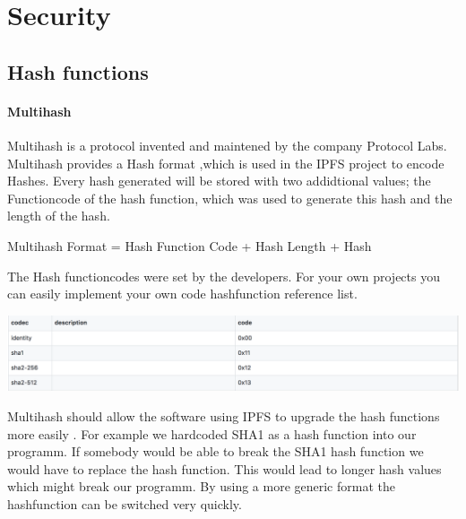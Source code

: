 \documentclass[a4paper,11pt, oneside]{report}
\theoremstyle{definition}
\begin{document}
\chapter{Security}
\section{Hash functions}
\subsubsection{Multihash}
Multihash is a protocol invented and maintened by the company Protocol Labs. Multihash provides a Hash format ,which is used in the IPFS project to encode Hashes. Every hash generated will be stored with two addidtional values; the Functioncode of the  hash function, which was used to generate this hash and the length of the hash.
\begin{center}
	Multihash Format = Hash Function Code + Hash Length + Hash
\end{center}
The Hash functioncodes were set by the developers. For your own projects you can easily implement your own code hashfunction reference list.
\begin{center}
	\includegraphics[width=\textwidth]{img/multiformat_hashfunctionid.png}
\end{center}
Multihash should allow the software using IPFS to upgrade the hash functions more easily \cite{multihash}. For example we hardcoded SHA1 as a hash function into our programm. If somebody would be able to break the SHA1 hash function we would have to replace the hash function. This would lead to longer hash values which might break our programm. By using a more generic format the hashfunction can be switched very quickly.
\end{document}
